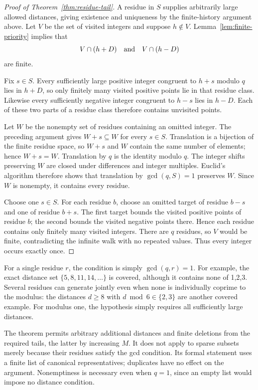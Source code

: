 \documentclass[11pt,a4paper]{article}
\begin{document}
\begin{proof}[Proof of Theorem~\ref{thm:residue-tail}]
A residue in $S$ supplies arbitrarily large allowed distances, giving
existence and uniqueness by the finite-history argument above. Let $V$
be the set of visited integers and suppose $h\notin V$.
Lemma~\ref{lem:finite-priority} implies that
\[
 V\cap(h+D)\quad\hbox{and}\quad V\cap(h-D)
\]
are finite.

Fix $s\in S$. Every sufficiently large positive integer congruent to
$h+s$ modulo $q$ lies in $h+D$, so only finitely many visited positive points lie in that residue class. Likewise every sufficiently negative integer congruent to
$h-s$ lies in $h-D$. Each of these two parts of a residue class therefore contains unvisited points.

Let $W$ be the nonempty set of residues containing an omitted integer.
The preceding argument gives $W+s\subseteq W$ for every $s\in S$.
Translation is a bijection of the finite residue space, so $W+s$ and $W$
contain the same number of elements; hence $W+s=W$. Translation by $q$ is the
identity modulo $q$. The integer shifts preserving $W$ are
closed under differences and integer multiples. Euclid's algorithm
therefore shows that translation by $\gcd(q,S)=1$ preserves $W$.
Since $W$ is nonempty, it contains every residue.

Choose one $s\in S$. For each residue $b$, choose an omitted target of
residue $b-s$ and one of residue $b+s$. The first target bounds the visited
positive points of residue $b$; the second bounds the visited negative
points there. Hence each residue contains only finitely many visited
integers. There are $q$ residues, so $V$ would be finite, contradicting the
infinite walk with no repeated values. Thus every integer occurs exactly once.
\end{proof}

For a single residue $r$, the condition is simply $\gcd(q,r)=1$.
For example, the exact distance set $\{5,8,11,14,\ldots\}$ is covered,
although it contains none of 1,2,3. Several residues can generate jointly
even when none is individually coprime to the modulus: the distances
$d\ge8$ with $d\bmod6\in\{2,3\}$ are another covered example.
For modulus one, the hypothesis simply requires all sufficiently large distances.

The theorem permits arbitrary additional distances and finite deletions
from the required tails, the latter by increasing $M$. It does not apply
to sparse subsets merely because their residues satisfy the gcd condition.
Its formal statement uses a finite list of canonical representatives;
duplicates have no effect on the argument. Nonemptiness is necessary even
when $q=1$, since an empty list would impose no distance condition.
\end{document}
